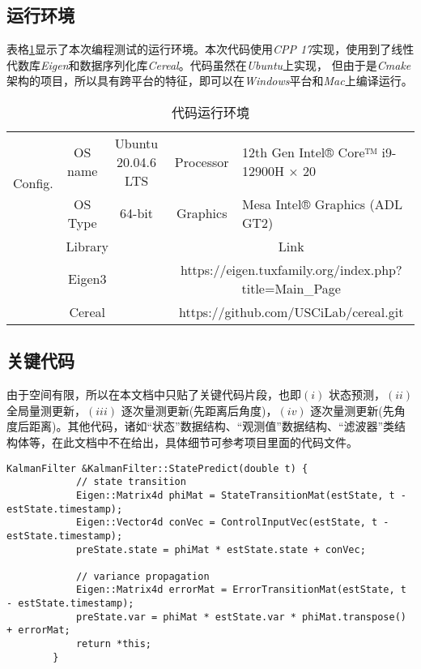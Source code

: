 \documentclass[12pt, onecolumn]{article}
\newcommand\normf{\fangsong}
\begin{document}
	\subsection{\normf 运行环境}
	表格\ref{tab:代码运行环境}显示了本次编程测试的运行环境。本次代码使用\emph{CPP 17}实现，使用到了线性代数库\emph{Eigen}和数据序列化库\emph{Cereal}。代码虽然在\emph{Ubuntu}上实现， 但由于是\emph{Cmake}架构的项目，所以具有跨平台的特征，即可以在\emph{Windows}平台和\emph{Mac}上编译运行。
	
	\begin{table}[h]
	\centering
	\caption{\normf 代码运行环境}
	\label{tab:代码运行环境}
	\vspace{5pt}
	\begin{tabular}{ccc|cl}
	\toprule
	\multicolumn{1}{c|}{\multirow{2}{*}{Config.}} & OS name & Ubuntu 20.04.6 LTS & Processor              & 12th Gen Intel® Core™ i9-12900H × 20              \\ \cmidrule{2-5} 
	\multicolumn{1}{c|}{}                         & OS Type & 64-bit             & Graphics               & Mesa Intel® Graphics (ADL GT2)                    \\ \midrule[1pt]\midrule[1pt]
	\multicolumn{3}{c|}{Library}                                                 & \multicolumn{2}{c}{Link}                                                   \\ \midrule
	\multicolumn{3}{c|}{Eigen3}                                                  & \multicolumn{2}{c}{https://eigen.tuxfamily.org/index.php?title=Main\_Page} \\
	\multicolumn{3}{c|}{Cereal}                                                  & \multicolumn{2}{c}{https://github.com/USCiLab/cereal.git}                  \\ \bottomrule
	\end{tabular}
	\end{table}
	
	\subsection{\normf 关键代码}
	由于空间有限，所以在本文档中只贴了关键代码片段，也即$(i)$ 状态预测，$(ii)$ 全局量测更新，$(iii)$ 逐次量测更新(先距离后角度)，$(iv)$ 逐次量测更新(先角度后距离)。其他代码，诸如“状态”数据结构、“观测值”数据结构、“滤波器”类结构体等，在此文档中不在给出，具体细节可参考项目里面的代码文件。
	\begin{lstlisting}[caption={\normf “状态预测”算法实现}]
	    KalmanFilter &KalmanFilter::StatePredict(double t) {
	        // state transition
	        Eigen::Matrix4d phiMat = StateTransitionMat(estState, t - estState.timestamp);
	        Eigen::Vector4d conVec = ControlInputVec(estState, t - estState.timestamp);
	        preState.state = phiMat * estState.state + conVec;
	
	        // variance propagation
	        Eigen::Matrix4d errorMat = ErrorTransitionMat(estState, t - estState.timestamp);
	        preState.var = phiMat * estState.var * phiMat.transpose() + errorMat;
	        return *this;
	    }
	\end{lstlisting}
		
\end{document}

